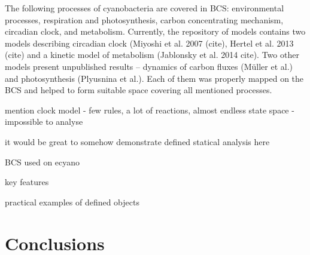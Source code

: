 \documentclass[12pt]{fithesis2}
\begin{document}
The following processes of cyanobacteria are covered in BCS: environmental processes, respiration and photosynthesis, carbon concentrating mechanism, circadian clock, and metabolism. Currently, the repository of models contains two models describing circadian clock (Miyoshi et al. 2007 (cite), Hertel et al. 2013 (cite) and a kinetic model of metabolism (Jablonsky et al. 2014 cite). Two other models present unpublished results -- dynamics of carbon fluxes (M\"{u}ller et al.) and photosynthesis (Plyusnina et al.). Each of them was properly mapped on the BCS and helped to form suitable space covering all mentioned processes.

mention clock model - few rules, a lot of reactions, almost endless state space - impossible to analyse

it would be great to somehow demonstrate defined statical analysis here

BCS used on ecyano

key features
 
practical examples of defined objects

\chapter{Conclusions}

\printbibliography
\end{document}

